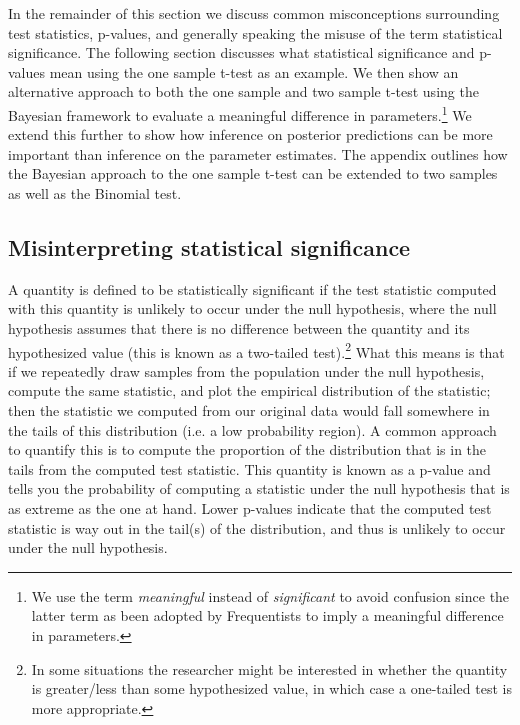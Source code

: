 \documentclass[12pt]{article}
\begin{document}
\noindent In the remainder of this section we discuss common misconceptions surrounding test statistics, p-values, and generally speaking the misuse of the term statistical significance. The following section discusses what statistical significance and p-values mean using the one sample t-test as an example. We then show an alternative approach to both the one sample and two sample t-test using the Bayesian framework to evaluate a meaningful difference in parameters.\footnote{We use the term \emph{meaningful} instead of \emph{significant} to avoid confusion since the latter term as been adopted by Frequentists to imply a meaningful difference in parameters.} We extend this further to show how inference on posterior predictions can be more important than inference on the parameter estimates. The appendix outlines how the Bayesian approach to the one sample t-test can be extended to two samples as well as the Binomial test. \\

\subsection{Misinterpreting statistical significance}

\noindent A quantity is defined to be statistically significant if the test statistic computed with this quantity is unlikely to occur under the null hypothesis, where the null hypothesis assumes that there is no difference between the quantity and its hypothesized value (this is known as a two-tailed test).\footnote{In some situations the researcher might be interested in whether the quantity is greater/less than some hypothesized value, in which case a one-tailed test is more appropriate.} What this means is that if we repeatedly draw samples from the population under the null hypothesis, compute the same statistic, and plot the empirical distribution of the statistic; then the statistic we computed from our original data would fall somewhere in the tails of this distribution (i.e. a low probability region). A common approach to quantify this is to compute the proportion of the distribution that is in the tails from the computed test statistic. This quantity is known as a p-value and tells you the probability of computing a statistic under the null hypothesis that is as extreme as the one at hand. Lower p-values indicate that the computed test statistic is way out in the tail(s) of the distribution, and thus is unlikely to occur under the null hypothesis. \\
\end{document}
